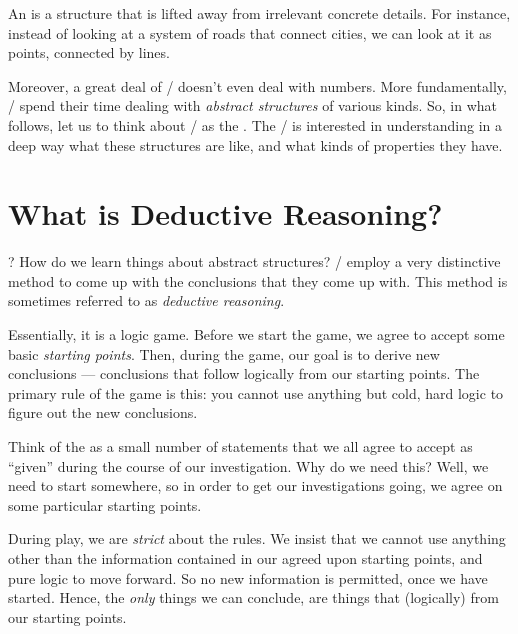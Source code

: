 \documentclass[../../../main.tex]{subfiles}
\begin{document}
\begin{terminology}
An  is a structure that is lifted away from irrelevant concrete details. For instance, instead of looking at a system of roads that connect cities, we can look at it as points, connected by lines.
\end{terminology}

Moreover, a great deal of \math/ doesn't even deal with numbers. More fundamentally, \mathers/ spend their time dealing with \emph{abstract structures} of various kinds. So, in what follows, let us to think about \math/ as the . The \mather/ is interested in understanding in a deep way what these structures are like, and what kinds of properties they have.


\section{What is Deductive Reasoning?}

? How do we learn things about abstract structures? \Mathers/ employ a very distinctive method to come up with the conclusions that they come up with. This method is sometimes referred to as \emph{deductive reasoning}.

Essentially, it is a logic game. Before we start the game, we agree to accept some basic \emph{starting points}. Then, during the game, our goal is to derive new conclusions --- conclusions that follow logically from our starting points. The primary rule of the game is this: you cannot use anything but cold, hard logic to figure out the new conclusions. 

\begin{aside}
  \begin{remark}
    Think of the  as a small number of statements that we all agree to accept as ``given'' during the course of our investigation. Why do we need this? Well, we need to start somewhere, so in order to get our investigations going, we agree on some particular starting points.
  \end{remark}
\end{aside}

During play, we are \emph{strict} about the rules. We insist that we cannot use anything other than the information contained in our agreed upon starting points, and pure logic to move forward. So no new information is permitted, once we have started. Hence, the \emph{only} things we can conclude, are things that  (logically) from our starting points.
\end{document}
